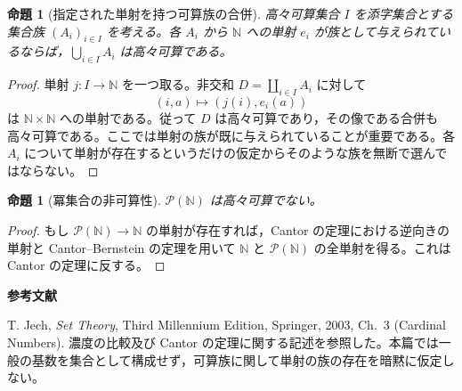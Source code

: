 \documentclass[a5paper,10pt,dvipdfmx]{jsarticle}
\theoremstyle{definition}
\theoremstyle{plain}
\newtheorem{prop}[ruledef]{命題}
\newcommand{\Pow}{\mathcal{P}}
\begin{document}
\begin{prop}[指定された単射を持つ可算族の合併]\label{k144}
高々可算集合 $I$ を添字集合とする集合族 $(A_i)_{i\in I}$ を考える。各 $A_i$ から $\mathbb N$ への単射 $e_i$ が族として与えられているならば，$\bigcup_{i\in I}A_i$ は高々可算である。
\end{prop}
\begin{proof}
単射 $j\colon I\to\mathbb N$ を一つ取る。非交和 $D=\coprod_{i\in I}A_i$ に対して
\[ (i,a)\longmapsto(j(i),e_i(a)) \]
は $\mathbb N\times\mathbb N$ への単射である。従って $D$ は高々可算であり，その像である合併も高々可算である。ここでは単射の族が既に与えられていることが重要である。各 $A_i$ について単射が存在するというだけの仮定からそのような族を無断で選んではならない。
\end{proof}
\begin{prop}[冪集合の非可算性]\label{k145}
$\Pow(\mathbb N)$ は高々可算でない。
\end{prop}
\begin{proof}
もし $\Pow(\mathbb N)\to\mathbb N$ の単射が存在すれば，Cantor の定理における逆向きの単射と Cantor--Bernstein の定理を用いて $\mathbb N$ と $\Pow(\mathbb N)$ の全単射を得る。これは Cantor の定理に反する。
\end{proof}
\par\medskip\noindent\textbf{参考文献}\par\smallskip
\noindent T. Jech, \textit{Set Theory}, Third Millennium Edition, Springer, 2003, Ch.~3 (Cardinal Numbers). 濃度の比較及び Cantor の定理に関する記述を参照した。本篇では一般の基数を集合として構成せず，可算族に関して単射の族の存在を暗黙に仮定しない。
\end{document}
